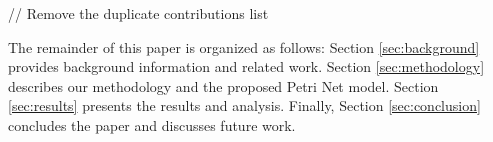 // Remove the duplicate contributions list

The remainder of this paper is organized as follows: Section \ref{sec:background} provides background information and related work. Section \ref{sec:methodology} describes our methodology and the proposed Petri Net model. Section \ref{sec:results} presents the results and analysis. Finally, Section \ref{sec:conclusion} concludes the paper and discusses future work.